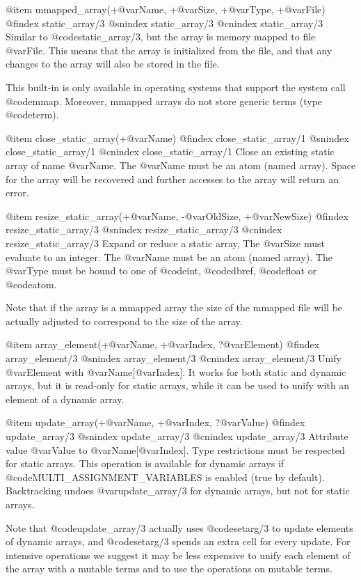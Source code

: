 {{{{{{{@item mmapped_array(+@var{Name}, +@var{Size}, +@var{Type}, +@var{File})
@findex static_array/3
@snindex static_array/3
@cnindex static_array/3
Similar to @code{static_array/3}, but the array is memory mapped to file
@var{File}. This means that the array is initialized from the file, and
that any changes to the array will also be stored in the file. 

This built-in is only available in operating systems that support the
system call @code{mmap}. Moreover, mmapped arrays do not store generic
terms (type @code{term}).

@item close_static_array(+@var{Name})
@findex close_static_array/1
@snindex close_static_array/1
@cnindex close_static_array/1
Close an existing static array of name @var{Name}. The @var{Name} must
be an atom (named array). Space for the array will be recovered and
further accesses to the array will return an error. 

@item resize_static_array(+@var{Name}, -@var{OldSize}, +@var{NewSize})
@findex resize_static_array/3
@snindex resize_static_array/3
@cnindex resize_static_array/3
Expand or reduce a static array, The @var{Size} must evaluate to an
integer. The @var{Name} must be an atom (named array). The @var{Type}
must be bound to one of @code{int}, @code{dbref}, @code{float} or
@code{atom}.

Note that if the array is a mmapped array the size of the mmapped file
will be actually adjusted to correspond to the size of the array.

@item array_element(+@var{Name}, +@var{Index}, ?@var{Element})
@findex array_element/3
@snindex array_element/3
@cnindex array_element/3
Unify @var{Element} with @var{Name}[@var{Index}]. It works for both
static and dynamic arrays, but it is read-only for static arrays, while
it can be used to unify with an element of a dynamic array.

@item update_array(+@var{Name}, +@var{Index}, ?@var{Value}) 
@findex update_array/3
@snindex update_array/3
@cnindex update_array/3
Attribute value @var{Value} to @var{Name}[@var{Index}]. Type
restrictions must be respected for static arrays. This operation is
available for dynamic arrays if @code{MULTI_ASSIGNMENT_VARIABLES} is
enabled (true by default). Backtracking undoes @var{update_array/3} for
dynamic arrays, but not for static arrays.

Note that @code{update_array/3} actually uses @code{setarg/3} to update
elements of dynamic arrays, and @code{setarg/3} spends an extra cell for
every update. For intensive operations we suggest it may be less
expensive to unify each element of the array with a mutable terms and
to use the operations on mutable terms.

}}}}}}}

